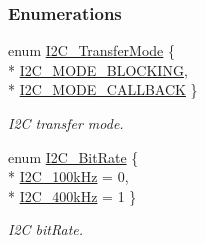 \subsubsection*{Enumerations}
\begin{DoxyCompactItemize}
\item 
enum \hyperlink{_i2_c_8h_a39f3b9340fc4ee241b0d2da9b2841c26}{I2\+C\+\_\+\+Transfer\+Mode} \{ \\*
\hyperlink{_i2_c_8h_a39f3b9340fc4ee241b0d2da9b2841c26abe065350be2a0ae5c9beb24624626c75}{I2\+C\+\_\+\+M\+O\+D\+E\+\_\+\+B\+L\+O\+C\+K\+I\+N\+G}, 
\\*
\hyperlink{_i2_c_8h_a39f3b9340fc4ee241b0d2da9b2841c26a129731a7edeb285f43a54b2cf9f5ac72}{I2\+C\+\_\+\+M\+O\+D\+E\+\_\+\+C\+A\+L\+L\+B\+A\+C\+K}
 \}
\begin{DoxyCompactList}\small\item\em I2\+C transfer mode. \end{DoxyCompactList}\item 
enum \hyperlink{_i2_c_8h_ac954e3197f04c50293db466c4abb6fbe}{I2\+C\+\_\+\+Bit\+Rate} \{ \\*
\hyperlink{_i2_c_8h_ac954e3197f04c50293db466c4abb6fbea966fd2df13b3a9825615c50335cf1987}{I2\+C\+\_\+100k\+Hz} = 0, 
\\*
\hyperlink{_i2_c_8h_ac954e3197f04c50293db466c4abb6fbea83cc3750242e6ae9194cd7ed94f764d9}{I2\+C\+\_\+400k\+Hz} = 1
 \}
\begin{DoxyCompactList}\small\item\em I2\+C bit\+Rate. \end{DoxyCompactList}\end{DoxyCompactItemize}
